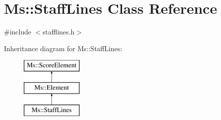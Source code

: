 \hypertarget{class_ms_1_1_staff_lines}{}\section{Ms\+:\+:Staff\+Lines Class Reference}
\label{class_ms_1_1_staff_lines}


{\ttfamily \#include $<$stafflines.\+h$>$}

Inheritance diagram for Ms\+:\+:Staff\+Lines\+:\begin{figure}[H]
\begin{center}
\leavevmode
\includegraphics[height=3.000000cm]{class_ms_1_1_staff_lines}
\end{center}
\end{figure}
